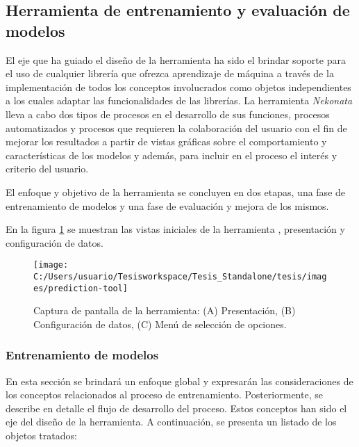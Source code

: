 \subsection{Herramienta de entrenamiento y evaluación de modelos\label{subsec:Herramienta-de-entrenamiento}}

El eje que ha guiado el diseño de la herramienta ha sido el brindar
soporte para el uso de cualquier librería que ofrezca aprendizaje
de máquina a través de la implementación de todos los conceptos involucrados
como objetos independientes a los cuales adaptar las funcionalidades
de las librerías. La herramienta \emph{Nekonata} lleva a cabo dos
tipos de procesos en el desarrollo de sus funciones, procesos automatizados
y procesos que requieren la colaboración del usuario con el fin de
mejorar los resultados a partir de vistas gráficas sobre el comportamiento
y características de los modelos y además, para incluir en el proceso
el interés y criterio del usuario. 

El enfoque y objetivo de la herramienta se concluyen en dos etapas,
una fase de entrenamiento de modelos y una fase de evaluación y mejora
de los mismos. 

En la figura \ref{fig:prediction-tool} se muestran las vistas iniciales
de la herramienta , presentación y configuración de datos. 

\begin{figure}
\begin{centering}
\texttt{[image: C:/Users/usuario/Tesisworkspace/Tesis\_Standalone/tesis/images/prediction-tool]}
\par\end{centering}

\caption{Captura de pantalla de la herramienta: (A) Presentación, (B) Configuración
de datos, (C) Menú de selección de opciones.\label{fig:prediction-tool}}
\end{figure}



\subsubsection{Entrenamiento de modelos}

En esta sección se brindará un enfoque global y expresarán las consideraciones
de los conceptos relacionados al proceso de entrenamiento. Posteriormente,
se describe en detalle el flujo de desarrollo del proceso. Estos conceptos
han sido el eje del diseño de la herramienta. A continuación, se presenta
un listado de los objetos tratados: 



